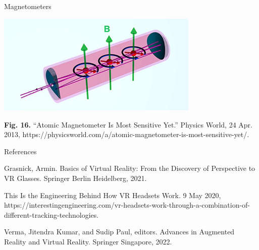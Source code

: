 \documentclass[14pt]{beamer}
\theoremstyle{plain}
\theoremstyle{definition}
\theoremstyle{remark}
\begin{document}
\begin{frame}{Magnetometers}
\begin{center}
\includegraphics[width=3.8in]{Image Magnetometer.jpg}
\end{center}
\tiny{\textbf{Fig. 16.} “Atomic Magnetometer Is Most Sensitive Yet.” Physics World, 24 Apr. 2013, https://physicsworld.com/a/atomic-magnetometer-is-most-sensitive-yet/.}
\end{frame}


\begin{frame}{References}
\begin{thebibliography}{9}

 Grasnick, Armin. Basics of Virtual Reality: From the Discovery of Perspective to VR Glasses. Springer Berlin Heidelberg, 2021.

 This Is the Engineering Behind How VR Headsets Work. 9 May 2020, https://interestingengineering.com/vr-headsets-work-through-a-combination-of-different-tracking-technologies.

 Verma, Jitendra Kumar, and Sudip Paul, editors. Advances in Augmented Reality and Virtual Reality. Springer Singapore, 2022.
\end{thebibliography}
\end{frame}
\end{document}
